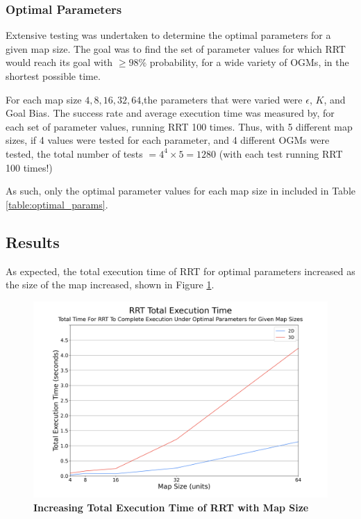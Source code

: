    \subsubsection{Optimal Parameters}
    \label{section:rrt_optimal_params}
        Extensive testing was undertaken to determine the optimal parameters for a given map size. The goal was to find the set of parameter values for which \gls{RRT} would reach its goal with $\geq98\%$ probability, for a wide variety of \glspl{OGM}, in the shortest possible time. 

        For each map size ${4, 8, 16, 32, 64}$,the parameters that were varied were $\epsilon$, $K$, and Goal Bias. The success rate and average execution time was measured by, for each set of parameter values, running \gls{RRT} 100 times. Thus, with 5 different map sizes, if 4 values were tested for each parameter, and 4 different \glspl{OGM} were tested, the total number of tests $= 4^4 \times 5 = 1280$ (with each test running \gls{RRT} 100 times!)

        As such, only the optimal parameter values for each map size in included in Table \ref{table:optimal_params}.

        

\subsection{Results}
\label{section:rrt_analysis_results}
    As expected, the total execution time of \gls{RRT} for optimal parameters increased as the size of the map increased, shown in Figure \ref{fig:rrt_profiling_timing}.

    \begin{figure}[H]
    \begin{centering}
    \includegraphics[width=0.65\linewidth]{chapters/chapter2/img/profiling/timing.png}
    \caption[Increasing Total Execution Time of RRT with Map Size]{\textbf{Increasing Total Execution Time of RRT with Map Size}}
    \label{fig:rrt_profiling_timing}
    \end{centering}
    \end{figure}
    
